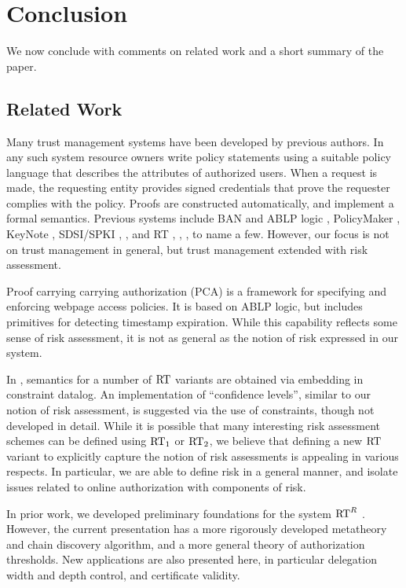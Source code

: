 \section{Conclusion}
\label{section-conclusion}

We now conclude with comments on related work and a short summary of
the paper.

\subsection{Related Work}

Many trust management systems have been developed by previous
authors. In any such system resource owners write policy statements
using a suitable policy language that describes the attributes of
authorized users. When a request is made, the requesting entity
provides signed credentials that prove the requester complies with the
policy.  Proofs are constructed automatically, and implement a formal
semantics.  Previous systems include BAN \cite{BAN} and ABLP logic
\cite{ABLP93}, PolicyMaker \cite{Blaze96a}, KeyNote \cite{RFC-2704},
SDSI/SPKI \cite{rivest-lampson-96}, \cite{ellison-etal-rfc99}, and RT
\cite{Li:2002-05}, \cite{Li:2003-02}, \cite{Li:2003-04}, to name a
few.  However, our focus is not on trust management in general, but
trust management extended with risk assessment.

Proof carrying carrying authorization (PCA)
\cite{bauer-phd,Appel99ccs} is a framework for specifying and
enforcing webpage access policies.  It is based on ABLP logic, but
includes primitives for detecting timestamp expiration.  While this
capability reflects some sense of risk assessment, it is not as
general as the notion of risk expressed in our system.

In \cite{anderson-ms-thesis}, semantics for a number of $\text{RT}$ variants
are obtained via embedding in constraint datalog.  An implementation
of ``confidence levels'', similar to our notion of risk assessment, is
suggested via the use of constraints, though not developed in detail.
While it is possible that many interesting risk assessment schemes can
be defined using $\text{RT}_1$ or $\text{RT}_2$, we believe that defining a new
$\text{RT}$ variant to explicitly capture the notion of risk assessments is
appealing in various respects.  In particular, we are able to define
risk in a general manner, and isolate issues related to online
authorization with components of risk.

In prior work, we developed preliminary foundations for the system
$\text{RT}^R$ \cite{chapin-skalka-wang-fmse05}.  However, the current
presentation has a more rigorously developed metatheory and chain
discovery algorithm, and a more general theory of authorization
thresholds.  New applications are also presented here, in particular
delegation width and depth control, and certificate validity.

